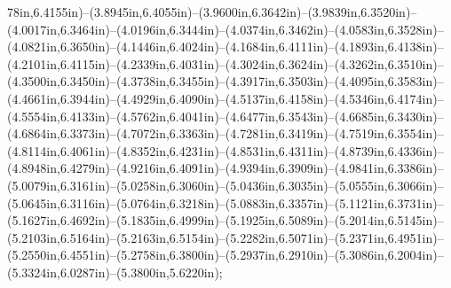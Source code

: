 78in,6.4155in)--(3.8945in,6.4055in)--(3.9600in,6.3642in)--(3.9839in,6.3520in)--(4.0017in,6.3464in)--(4.0196in,6.3444in)--(4.0374in,6.3462in)--(4.0583in,6.3528in)--(4.0821in,6.3650in)--(4.1446in,6.4024in)--(4.1684in,6.4111in)--(4.1893in,6.4138in)--(4.2101in,6.4115in)--(4.2339in,6.4031in)--(4.3024in,6.3624in)--(4.3262in,6.3510in)--(4.3500in,6.3450in)--(4.3738in,6.3455in)--(4.3917in,6.3503in)--(4.4095in,6.3583in)--(4.4661in,6.3944in)--(4.4929in,6.4090in)--(4.5137in,6.4158in)--(4.5346in,6.4174in)--(4.5554in,6.4133in)--(4.5762in,6.4041in)--(4.6477in,6.3543in)--(4.6685in,6.3430in)--(4.6864in,6.3373in)--(4.7072in,6.3363in)--(4.7281in,6.3419in)--(4.7519in,6.3554in)--(4.8114in,6.4061in)--(4.8352in,6.4231in)--(4.8531in,6.4311in)--(4.8739in,6.4336in)--(4.8948in,6.4279in)--(4.9216in,6.4091in)--(4.9394in,6.3909in)--(4.9841in,6.3386in)--(5.0079in,6.3161in)--(5.0258in,6.3060in)--(5.0436in,6.3035in)--(5.0555in,6.3066in)--(5.0645in,6.3116in)--(5.0764in,6.3218in)--(5.0883in,6.3357in)--(5.1121in,6.3731in)--(5.1627in,6.4692in)--(5.1835in,6.4999in)--(5.1925in,6.5089in)--(5.2014in,6.5145in)--(5.2103in,6.5164in)--(5.2163in,6.5154in)--(5.2282in,6.5071in)--(5.2371in,6.4951in)--(5.2550in,6.4551in)--(5.2758in,6.3800in)--(5.2937in,6.2910in)--(5.3086in,6.2004in)--(5.3324in,6.0287in)--(5.3800in,5.6220in);
